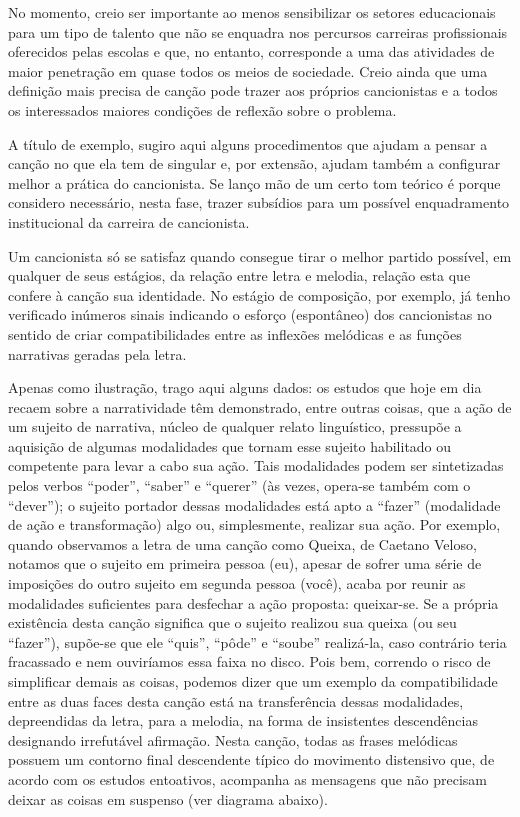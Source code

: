 No momento, creio ser importante ao menos sensibilizar os setores
educacionais para um tipo de talento que não se enquadra nos percursos
carreiras profissionais oferecidos pelas escolas e que, no entanto,
corresponde a uma das atividades de maior penetração em quase todos os
meios de sociedade. Creio ainda que uma definição mais precisa de canção
pode trazer aos próprios cancionistas e a todos os interessados maiores
condições de reflexão sobre o problema.

A título de exemplo, sugiro aqui alguns procedimentos que ajudam a
pensar a canção no que ela tem de singular e, por extensão, ajudam
também a configurar melhor a prática do cancionista. Se lanço mão de um
certo tom teórico é porque considero necessário, nesta fase, trazer
subsídios para um possível enquadramento institucional da carreira de
cancionista.

Um cancionista só se satisfaz quando consegue tirar o melhor partido
possível, em qualquer de seus estágios, da relação entre letra e
melodia, relação esta que confere à canção sua identidade. No estágio de
composição, por exemplo, já tenho verificado inúmeros sinais indicando o
esforço (espontâneo) dos cancionistas no sentido de criar
compatibilidades entre as inflexões melódicas e as funções narrativas
geradas pela letra.

Apenas como ilustração, trago aqui alguns dados: os estudos que hoje em
dia recaem sobre a narratividade têm demonstrado, entre outras coisas,
que a ação de um sujeito de narrativa, núcleo de qualquer relato
linguístico, pressupõe a aquisição de algumas modalidades que tornam
esse sujeito habilitado ou competente para levar a cabo sua ação. Tais
modalidades podem ser sintetizadas pelos verbos ``poder'', ``saber'' e
``querer'' (às vezes, opera-se também com o ``dever''); o sujeito
portador dessas modalidades está apto a ``fazer'' (modalidade de ação e
transformação) algo ou, simplesmente, realizar sua ação. Por exemplo,
quando observamos a letra de uma canção como Queixa, de Caetano Veloso,
notamos que o sujeito em primeira pessoa (eu), apesar de sofrer uma
série de imposições do outro sujeito em segunda pessoa (você), acaba por
reunir as modalidades suficientes para desfechar a ação proposta:
queixar-se. Se a própria existência desta canção significa que o sujeito
realizou sua queixa (ou seu ``fazer''), supõe-se que ele ``quis'',
``pôde'' e ``soube'' realizá-la, caso contrário teria fracassado e nem
ouviríamos essa faixa no disco. Pois bem, correndo o risco de
simplificar demais as coisas, podemos dizer que um exemplo da
compatibilidade entre as duas faces desta canção está na transferência
dessas modalidades, depreendidas da letra, para a melodia, na forma de
insistentes descendências designando irrefutável afirmação. Nesta
canção, todas as frases melódicas possuem um contorno final descendente
típico do movimento distensivo que, de acordo com os estudos entoativos,
acompanha as mensagens que não precisam deixar as coisas em suspenso
(ver diagrama abaixo).

